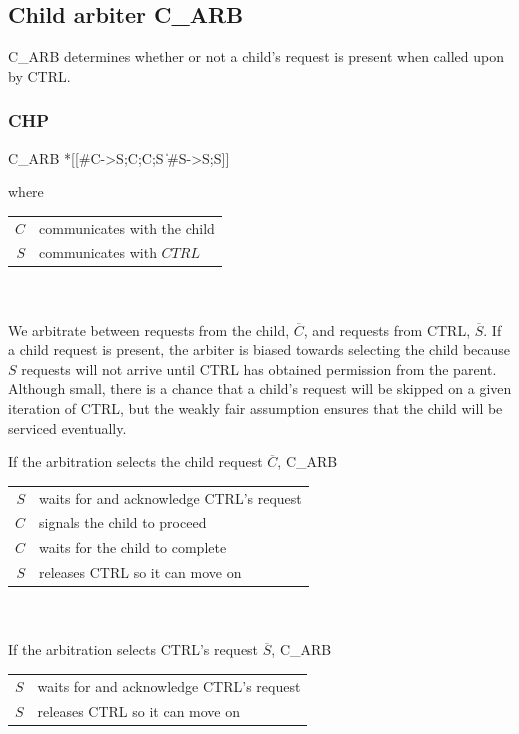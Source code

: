 \documentclass{article}
\begin{document}
\subsection{Child arbiter C\_ARB}
C\_ARB determines whether or not a child's request is present when called upon by CTRL.

\subsubsection*{CHP}

\begin{csp}
C_ARB\equiv
  *[[#C->S;C;C;S
    \|#S->S;S]]
\end{csp}

\noindent where 

\begin{tabular}[]{rl}
  $C$ & communicates with the child \\ 
  $S$ & communicates with $CTRL$ \\
\end{tabular} \\ \\

We arbitrate between requests from the child, $\overline{C}$, and 
requests from CTRL, $\overline{S}$. If a child request is present, the arbiter is biased towards selecting the child because $S$ requests will not arrive until CTRL has obtained permission from the parent. Although small, there is a chance that a child's request will be skipped on a given iteration of CTRL, but the weakly fair assumption ensures that the child will be serviced eventually.

\noindent If the arbitration selects the child request $\overline{C}$, C\_ARB

\begin{tabular}[]{rl}
  $S$ & waits for and acknowledge CTRL's request \\
  $C$ & signals the child to proceed \\
  $C$ & waits for the child to complete \\
  $S$ & releases CTRL so it can move on \\
\end{tabular} \\ \\

\noindent If the arbitration selects CTRL's request $\overline{S}$, C\_ARB

\begin{tabular}[]{rl}
  $S$ & waits for and acknowledge CTRL's request \\
  $S$ & releases CTRL so it can move on \\
\end{tabular} \\ \\
\end{document}

